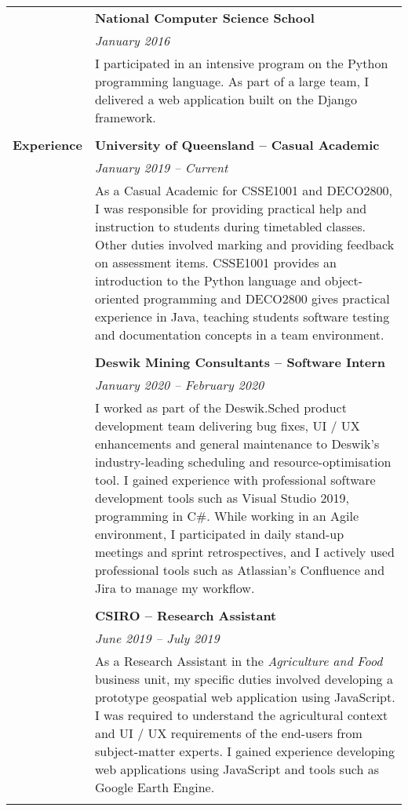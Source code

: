 \documentclass[12pt,twoside,a4paper]{article}
\begin{document}
\begin{longtable}{r p{13cm}}
										\vline & \textbf{National Computer Science School} \\
										\vline & \textit{January 2016} \\
										\vline & I participated in an intensive program on the Python programming language. As part of a large team, I delivered a web application built on the Django framework. \\
										& \\
										
	\textbf{Experience} 		\vline & \textbf{University of Queensland – Casual Academic} \\
										\vline & \textit{January 2019 – Current} \\
										\vline & As a Casual Academic for CSSE1001 and DECO2800, I was responsible for providing practical help and instruction to students during timetabled classes. Other duties involved marking and providing feedback on assessment items. CSSE1001 provides an introduction to the Python language and object-oriented programming and DECO2800 gives practical experience in Java, teaching students software testing and documentation concepts in a team environment. \\ 
										\vline & \\
										
										\vline & \textbf{Deswik Mining Consultants – Software Intern} \\
										\vline & \textit{January 2020 – February 2020} \\
										\vline & I worked as part of the Deswik.Sched product development team delivering bug fixes, UI / UX enhancements and general maintenance to Deswik’s industry-leading scheduling and resource-optimisation tool. I gained experience with professional software development tools such as Visual Studio 2019, programming in C\#. While working in an Agile environment, I participated in daily stand-up meetings and sprint retrospectives, and I actively used professional tools such as Atlassian’s Confluence and Jira to manage my workflow. \\ 
										\vline & \\
										
										\vline & \textbf{CSIRO – Research Assistant} \\
										\vline & \textit{June 2019 – July 2019} \\
										\vline & As a Research Assistant in the \textit{Agriculture and Food} business unit, my specific duties involved developing a prototype geospatial web application using JavaScript. I was required to understand the agricultural context and UI / UX requirements of the end-users from subject-matter experts. I gained experience developing web applications using JavaScript and tools such as Google Earth Engine. \\
										\vline & \\
										

\end{longtable}
\end{document}
